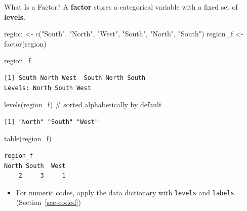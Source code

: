 \documentclass[
  ignorenonframetext,
  aspectratio=169,
]{beamer}
\newenvironment{Shaded}{\begin{snugshade}}{\end{snugshade}}
\newcommand{\CommentTok}[1]{\textcolor[rgb]{0.37,0.37,0.37}{#1}}
\newcommand{\FunctionTok}[1]{\textcolor[rgb]{0.28,0.35,0.67}{#1}}
\newcommand{\NormalTok}[1]{\textcolor[rgb]{0.00,0.23,0.31}{#1}}
\newcommand{\OtherTok}[1]{\textcolor[rgb]{0.00,0.23,0.31}{#1}}
\newcommand{\StringTok}[1]{\textcolor[rgb]{0.13,0.47,0.30}{#1}}
\providecommand{\tightlist}{%
  \setlength{\itemsep}{0pt}\setlength{\parskip}{0pt}}\usepackage{longtable,booktabs,array}
\begin{document}
\begin{frame}[fragile]{What Is a Factor?}
\protect\hypertarget{what-is-a-factor}{}
A \textbf{factor} stores a categorical variable with a fixed set of
\textbf{levels}.

\begin{Shaded}
\begin{Highlighting}[]
\NormalTok{region }\OtherTok{\textless{}{-}} \FunctionTok{c}\NormalTok{(}\StringTok{"South"}\NormalTok{, }\StringTok{"North"}\NormalTok{, }\StringTok{"West"}\NormalTok{, }\StringTok{"South"}\NormalTok{, }\StringTok{"North"}\NormalTok{, }\StringTok{"South"}\NormalTok{)}
\NormalTok{region\_f }\OtherTok{\textless{}{-}} \FunctionTok{factor}\NormalTok{(region)}

\NormalTok{region\_f}
\end{Highlighting}
\end{Shaded}

\begingroup\tiny\color{darkgray}

\begin{verbatim}
[1] South North West  South North South
Levels: North South West
\end{verbatim}

\endgroup

\begin{Shaded}
\begin{Highlighting}[]
\FunctionTok{levels}\NormalTok{(region\_f)        }\CommentTok{\# sorted alphabetically by default}
\end{Highlighting}
\end{Shaded}

\begingroup\tiny\color{darkgray}

\begin{verbatim}
[1] "North" "South" "West" 
\end{verbatim}

\endgroup

\begin{Shaded}
\begin{Highlighting}[]
\FunctionTok{table}\NormalTok{(region\_f)}
\end{Highlighting}
\end{Shaded}

\begingroup\tiny\color{darkgray}

\begin{verbatim}
region_f
North South  West 
    2     3     1 
\end{verbatim}

\endgroup

\begin{itemize}
\tightlist
\item
  For numeric codes, apply the data dictionary with \texttt{levels} and
  \texttt{labels} (Section~\ref{sec-coded})
\end{itemize}
\end{frame}
\end{document}
